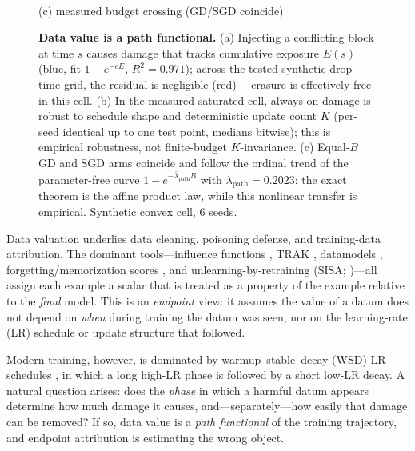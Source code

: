 \documentclass{article}
\newcommand{\Expo}{E}         %
\newcommand{\B}{B}            %
\newcommand{\lam}{\lambda}
\newcommand{\lampath}{\bar{\lam}_{\mathrm{path}}}
\begin{document}
\begin{figure}[t]
\begin{minipage}{0.31\textwidth}
\\[2pt]
{\small (c) measured budget crossing (GD/SGD coincide)}
\end{minipage}
\caption{\textbf{Data value is a path functional.} (a) Injecting a conflicting block at time
$s$ causes damage that tracks cumulative exposure $\Expo(s)$ (blue, fit $1-e^{-c\Expo}$,
$R^2{=}0.971$); across the tested synthetic drop-time grid, the residual is negligible (red)---
erasure is effectively free in this cell. (b) In the measured saturated cell, always-on damage is robust to schedule
shape and deterministic update count $K$ (per-seed identical up to one test point, medians
bitwise); this is empirical robustness, not finite-budget $K$-invariance. (c) Equal-$\B$ GD and
SGD arms coincide and follow the ordinal trend of the parameter-free curve
$1-e^{-\lampath\B}$ with $\lampath=0.2023$; the exact theorem is the affine product law, while
this nonlinear transfer is empirical. Synthetic convex cell, 6 seeds.}
\label{fig:main}
\end{figure}

Data valuation underlies data cleaning, poisoning defense, and training-data attribution.
The dominant tools---influence functions \citep{koh2017understanding}, TRAK
\citep{park2023trak}, datamodels \citep{ilyas2022datamodels}, forgetting/memorization scores
\citep{toneva2019forgetting}, and unlearning-by-retraining (SISA; \citealp{bourtoule2021sisa})---all assign each example a scalar that is treated as a property of the
example relative to the \emph{final} model. This is an \emph{endpoint} view: it assumes the
value of a datum does not depend on \emph{when} during training the datum was seen, nor on the
learning-rate (LR) schedule or update structure that followed.

Modern training, however, is dominated by warmup--stable--decay (WSD) LR schedules
\citep{hu2024minicpm}, in which a long high-LR phase is followed by a short low-LR decay. A
natural question arises: does the \emph{phase} in which a harmful datum appears determine how
much damage it causes, and---separately---how easily that damage can be removed? If so, data
value is a \emph{path functional} of the training trajectory, and endpoint attribution is
estimating the wrong object.
\end{document}
